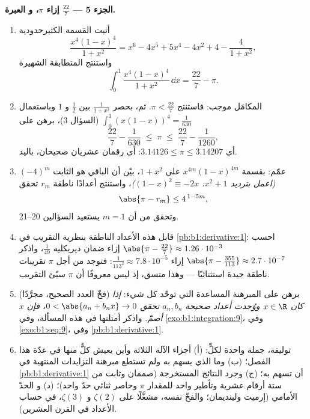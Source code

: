 \begin{problem}
\medskip
\noindent\textbf{الجزء 5 --- $\frac{22}{7}$ إزاء $\pi$، و
العبرة.}
\begin{enumerate}[resume]
  \item أثبت القسمة الكثيرحدودية
        \[
        \frac{x^4(1-x)^4}{1 + x^2}
        = x^6 - 4x^5 + 5x^4 - 4x^2 + 4 - \frac{4}{1 + x^2},
        \]
        واستنتج المتطابقة الشهيرة
        \[
        \int_0^1 \frac{x^4 (1-x)^4}{1 + x^2}\,\dd x
        = \frac{22}{7} - \pi .
        \]
  \item المكامَل موجب: فاستنتج $\pi <
        \frac{22}{7}$. ثم، بحصر $\frac{1}{1+x^2}$ بين
        $\frac12$ و $1$ وباستعمال $\int_0^1 (x(1-x))^4 =
        \frac{1}{630}$ (السؤال 3)، برهن على
        \[
        \frac{22}{7} - \frac{1}{630} \;\leq\; \pi \;\leq\;
        \frac{22}{7} - \frac{1}{1260} ,
        \]
        أي $3.14126 \leq \pi \leq 3.14207$: أي رقمان عشريان
        صحيحان، باليد.
  \item عمّم: بقسمة $x^{4m}(1-x)^{4m}$ على $1 + x^2$،
        بيّن أن الباقي هو الثابت $(-4)^m$ \emph{(اعمل
        بترديد $x^2 + 1$: $(1-x)^2 \equiv -2x$)}، واستنتج
        أعدادًا ناطقة $r_m$ تحقق
        \[
        \abs{\pi - r_m} \leq 4^{\,1 - 5m} ,
        \]
        وتحقق من أن $m = 1$ يستعيد السؤالين 20--21.
  \item قابل هذه الأعداد الناطقة بنظرية التقريب
        في \cref{pb:b1:derivative:1}: احسب $\abs{\pi -
        \frac{22}{7}} \approx 1.26\cdot10^{-3}$ إزاء
        ضمان ديريكليه $\frac{1}{49}$، واذكر
        $\abs{\pi - \frac{355}{113}} \approx 2.7\cdot10^{-7}$
        إزاء $\frac{1}{113^2} \approx 7.8\cdot10^{-5}$:
        فتوجد من أجل $\pi$ تقريبات ناطقة جيدة استثنائيًا
        --- وهذا متسق، إذ ليس معروفًا أن $\pi$ سيّئ
        التقريب.
  \item (فخّ العدد الصحيح، مجرَّدًا) برهن على المبرهنة المساعدة التي
        توحّد كل شيء: \emph{إذا كان $x \in \R$ ووُجدت
        أعداد صحيحة $a_n, b_n$ تحقق $0 < \abs{a_n + b_n x} \to 0$،
        فإن $x$ أصمّ.} واذكر أمثلتها في هذه
        المسألة، وفي \cref{exo:b1:integration:9}، وفي
        \cref{exo:b1:seq:9}، وفي \cref{pb:b1:derivative:1}.
  \item توليفة، جملة واحدة لكلٍّ: (أ) أجزاء الآلة الثلاثة
        وأين يعيش كلٌّ منها في عدّة هذا
        الفصل؛ (ب) وما الذي يسهم به  ولم تستطع
        مبرهنة التزايدات المنتهية في \cref{pb:b1:derivative:1}
        أن تسهم به؛ (ج) وجرد النتائج المستخرجة (صممان
        وثابت من ستة أرقام عشرية وتأطير
        واحد للمقدار $\pi$ وحاصر ثنائي حدّ واحد)؛ (د) و
        الحدّ الأمامي (إرميت ولينديمان؛ والفخّ نفسه، مشغَّلًا على
        $\zeta(2)$ و $\zeta(3)$، في حساب الأعداد في القرن
        العشرين).
\end{enumerate}
\end{problem}
